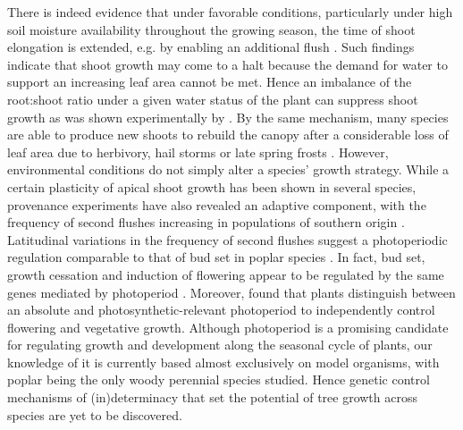 \documentclass{article}
\begin{document}
	There is indeed evidence that under favorable conditions, particularly under high soil moisture availability throughout the growing season, the time of shoot elongation is extended, e.g. by enabling an additional flush \citep{kayaAdaptiveSignificanceIntermittent1994}. 
	Such findings indicate that shoot growth may come to a halt because the demand for water to support an increasing leaf area cannot be met. Hence an imbalance of the root:shoot ratio under a given water status of the plant can suppress shoot growth as was shown experimentally by \citet{borchertSimulationRhythmicTree1973}. By the same mechanism, many species are able to produce new shoots to rebuild the canopy after a considerable loss of leaf area due to herbivory, hail storms or late spring frosts \citep{baumgartenNoRiskNo2023a}. 
	However, environmental conditions do not simply alter a species' growth strategy. While a certain plasticity of apical shoot growth has been shown in several species, provenance experiments have also revealed an adaptive component, with the frequency of second flushes increasing in populations of southern origin \citep{rudolphLammasGrowthProlepsis1964, soolanayakanahallyTimingPhotoperiodicCompetency2013a}.
	Latitudinal variations in the frequency of second flushes suggest a photoperiodic regulation comparable to that of bud set in poplar species  \citep{soolanayakanahallyTimingPhotoperiodicCompetency2013a}. In fact, bud set, growth cessation and induction of flowering appear to be regulated by the same genes mediated by photoperiod \citep{bohleniusCOFTRegulatory2006a}. Moreover, \citet{wangPlantsDistinguishDifferent2024b} found that plants distinguish between an absolute and photosynthetic-relevant photoperiod to independently control flowering and vegetative growth. 
	Although photoperiod is a promising candidate for regulating growth and development along the seasonal cycle of plants, our knowledge of it is currently based almost exclusively on model organisms, with poplar being the only woody perennial species studied. Hence genetic control mechanisms of (in)determinacy that set the potential of tree growth across species are yet to be discovered. 
	
	
										
\end{document}
